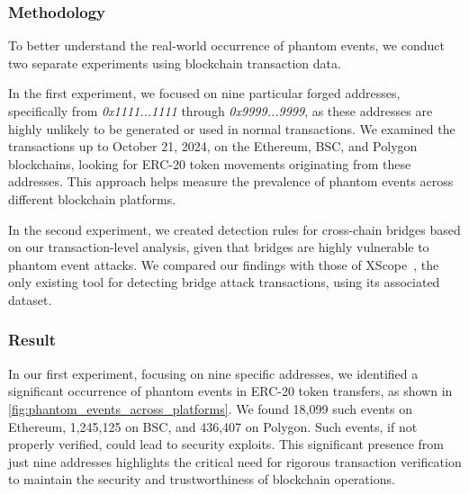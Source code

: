 \subsubsection{Methodology}

To better understand the real-world occurrence of phantom events, we conduct two separate experiments using blockchain transaction data.

In the first experiment, we focused on nine particular forged addresses, specifically from \emph{0x1111...1111} through \emph{0x9999...9999}, as these addresses are highly unlikely to be generated or used in normal transactions. We examined the transactions up to October 21, 2024, on the Ethereum, BSC, and Polygon blockchains, looking for ERC-20 token movements originating from these addresses. This approach helps measure the prevalence of phantom events across different blockchain platforms.

In the second experiment, we created detection rules for cross-chain bridges based on our transaction-level analysis, given that bridges are highly vulnerable to phantom event attacks. We compared our findings with those of XScope~\cite{Xscope}, the only existing tool for detecting bridge attack transactions, using its associated dataset.


\subsubsection{Result}




In our first experiment, focusing on nine specific addresses, we identified a significant occurrence of phantom events in ERC-20 token transfers, as shown in \cref{fig:phantom_events_across_platforms}. We found 18,099 such events on Ethereum, 1,245,125 on BSC, and 436,407 on Polygon. Such events, if not properly verified, could lead to security exploits. This significant presence from just nine addresses highlights the critical need for rigorous transaction verification to maintain the security and trustworthiness of blockchain operations.


